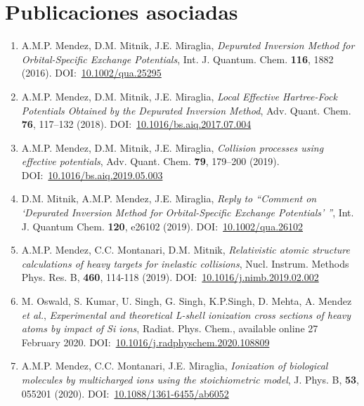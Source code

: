 \chapter*{Publicaciones asociadas}
\label{chap:publicaciones}

\begin{enumerate}

\item
A.M.P. Mendez, D.M. Mitnik, J.E. Miraglia,
\textit{Depurated Inversion Method for Orbital-Specific Exchange Potentials},
Int. J. Quantum. Chem. \textbf{116}, 1882 (2016). 
DOI:~\href{http://www.doi.org/10.1002/qua.25295}{10.1002/qua.25295}

\item
A.M.P. Mendez, D.M. Mitnik, J.E. Miraglia, 
\textit{Local Effective Hartree-Fock Potentials Obtained by the Depurated Inversion Method},
Adv. Quant. Chem. \textbf{76}, 117--132 (2018). 
DOI:~\href{http://www.doi.org/10.1016/bs.aiq.2017.07.004}{10.1016/bs.aiq.2017.07.004}

\item
A.M.P. Mendez, D.M. Mitnik, J.E. Miraglia, 
\textit{Collision processes using effective potentials},
Adv. Quant. Chem. \textbf{79}, 179--200 (2019). 
DOI:~\href{http://www.doi.org/10.1016/bs.aiq.2019.05.003}{10.1016/bs.aiq.2019.05.003}

\item
D.M. Mitnik, A.M.P. Mendez, J.E. Miraglia, 
\textit{Reply to ``Comment on `Depurated Inversion Method for Orbital-Specific
Exchange Potentials' ''}, 
Int. J. Quantum Chem. \textbf{120}, e26102 (2019). 
DOI:~\href{http://www.doi.org/10.1002/qua.26102}{10.1002/qua.26102}

\item
A.M.P. Mendez, C.C. Montanari, D.M. Mitnik, 
\textit{Relativistic atomic structure calculations of heavy targets for inelastic collisions},
Nucl. Instrum. Methods Phys. Res. B, \textbf{460}, 114-118 (2019). 
DOI:~\href{http://www.doi.org/10.1016/j.nimb.2019.02.002}{10.1016/j.nimb.2019.02.002}

\item
M. Oswald, S. Kumar, U. Singh, G. Singh, K.P.Singh, D. Mehta, A. Mendez 
\textit{et al.}, 
\textit{Experimental and theoretical L-shell ionization cross sections of heavy atoms by impact of Si ions},
Radiat. Phys. Chem., available online 27 February 2020. 
DOI:~\href{http://www.doi.org/10.1016/j.radphyschem.2020.108809}{10.1016/j.radphyschem.2020.108809}

\item
A.M.P. Mendez, C.C. Montanari, J.E. Miraglia,
\textit{Ionization of biological molecules by multicharged ions using the stoichiometric model},
J. Phys. B, \textbf{53}, 055201 (2020). 
DOI:~\href{http://www.doi.org/10.1088/1361-6455/ab6052}{10.1088/1361-6455/ab6052}


\end{enumerate}
